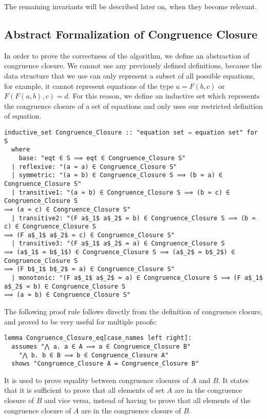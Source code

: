 The remaining invariants will be described later on, when they become relevant.

\subsection{Abstract Formalization of Congruence Closure}
\label{subsection:abstraction}

In order to prove the correctness of the algorithm, we define an abstraction of congruence closure. We cannot use any previously defined definitions, because the data structure that we use can only represent a subset of all possible equations, for example, it cannot represent equations of the type $a = F(b, c)$ or $F (F (a, b), c) = d$. For this reason, we define an inductive set which represents the congruence closure of a set of equations and only uses our restricted definition of equation.

\begin{lstlisting}
inductive_set Congruence_Closure :: "equation set ⇒ equation set" for S
  where
    base: "eqt ∈ S ⟹ eqt ∈ Congruence_Closure S"
  | reflexive: "(a ≈ a) ∈ Congruence_Closure S"
  | symmetric: "(a ≈ b) ∈ Congruence_Closure S ⟹ (b ≈ a) ∈ Congruence_Closure S"
  | transitive1: "(a ≈ b) ∈ Congruence_Closure S ⟹ (b ≈ c) ∈ Congruence_Closure S
⟹ (a ≈ c) ∈ Congruence_Closure S"
  | transitive2: "(F a$_1$ a$_2$ ≈ b) ∈ Congruence_Closure S ⟹ (b ≈ c) ∈ Congruence_Closure S
⟹ (F a$_1$ a$_2$ ≈ c) ∈ Congruence_Closure S"
  | transitive3: "(F a$_1$ a$_2$ ≈ a) ∈ Congruence_Closure S
⟹ (a$_1$ ≈ b$_1$) ∈ Congruence_Closure S ⟹ (a$_2$ ≈ b$_2$) ∈ Congruence_Closure S
⟹ (F b$_1$ b$_2$ ≈ a) ∈ Congruence_Closure S"
  | monotonic: "(F a$_1$ a$_2$ ≈ a) ∈ Congruence_Closure S ⟹ (F a$_1$ a$_2$ ≈ b) ∈ Congruence_Closure S
⟹ (a ≈ b) ∈ Congruence_Closure S"
\end{lstlisting}

The following proof rule follows directly from the definition of congruence closure, and proved to be very useful for multiple proofs:

\begin{lstlisting}
lemma Congruence_Closure_eq[case_names left right]:
  assumes "⋀ a. a ∈ A ⟹ a ∈ Congruence_Closure B"
    "⋀ b. b ∈ B ⟹ b ∈ Congruence_Closure A"
  shows "Congruence_Closure A = Congruence_Closure B"
\end{lstlisting}

It is used to prove equality between congruence closures of $A$ and $B$. It states that it is sufficient to prove that all elements of set $A$ are in the congruence closure of $B$ and vice versa, instead of having to prove that all elements of the congruence closure of $A$ are in the congruence closure of $B$.

